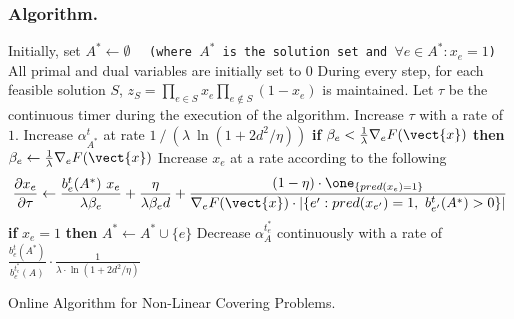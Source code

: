\subsubsection*{Algorithm.}


\begin{algorithm}[!ht]
	\begin{algorithmic}[1]
	\STATE Initially, set $A^* \gets \emptyset$ \ \ \texttt{(where $A^*$ is the solution set and $\forall e \in A^* : x_{e} = 1$)}
	\STATE All primal and dual variables are initially set to 0
	\STATE During every step, for each feasible solution $S$, $z_{S} = \prod_{e \in S} x_{e} \prod_{e \notin S} (1 - x_{e})$ is maintained.
	\STATE Let $\tau$ be the continuous timer during the execution of the algorithm.
			\STATE Increase $\tau$ with a rate of $1$.
			\STATE Increase $\alpha^{t}_{A^{*}}$ at rate $1\ /\ (\lambda \ \ln(1+2d^{2}/\eta))$
			\label{algo-covering:alpha}
				\STATE \textbf{if} $\beta_{e} <  \frac{1}{\lambda} \nabla_{e} F(\vect{x})$ \textbf{then}
				$\beta_{e} \gets \frac{1}{\lambda} \nabla_{e} F(\vect{x})$
				\label{algo-covering:beta}
				\STATE Increase $x_{e}$ at a rate according to the following
				\begin{align*}
					\frac{\partial x_{e}}{\partial \tau}	\gets
					\frac{b^{t}_{e}(A^{*}) \ x_{e}}{\lambda \beta_{e}} + \frac{\eta}{\lambda \beta_{e} d}
					+ \frac{(1 - \eta) \cdot \one_{\{pred(x_{e}) = 1\}}}{\nabla_{e} F(\vect{x}) \cdot |\{e': pred(x_{e'}) = 1,\ b^{t}_{e'}(A^{*}) > 0\}| }
				\end{align*}
				\label{algo-covering:x}
			\ENDFOR
			\STATE \textbf{if} $x_{e} = 1$ \textbf{then} $A^{*} \gets A^{*} \cup \{e\}$
			 \label{algo-decrease}
						 \label{algo-covering:bmax}
							\STATE Decrease $\alpha^{t_{e}^{*}}_{A}$ continuously with a rate of
							$\frac{b^{t}_{e}(A^{*})}{b^{t_{e}^{*}}_{e}(A)} \cdot\frac{1}{\lambda \cdot \ln(1+2d^{2}/\eta)}$
							\label{algo-covering:decrease}
					\ENDFOR
				\ENDWHILE
			\ENDFOR
		\ENDWHILE
	\ENDFOR
	\end{algorithmic}
	\caption{Online Algorithm for Non-Linear Covering Problems.}
	\label{algo:covering}
\end{algorithm}




